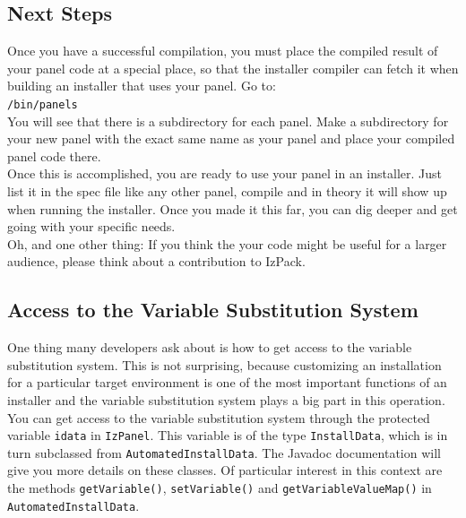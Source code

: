 \subsection{Next Steps}

Once you have a successful compilation, you must place the compiled result
of your panel code at a special place, so that the installer compiler can
fetch it when building an installer that uses your panel.  Go to:\\

\texttt{/bin/panels}\\

You will see that there is a subdirectory for each panel.  Make a
subdirectory for your new panel with the exact same name as your panel and
place your compiled panel code there.\\

Once this is accomplished, you are ready to use your panel in an
installer.  Just list it in the spec file like any other panel, compile
and in theory it will show up when running the installer.  Once you made
it this far, you can dig deeper and get going with your specific needs.\\

Oh, and one other thing: If you think the your code might be useful for a larger
audience, please think about a contribution to IzPack.

\subsection{Access to the Variable Substitution System}

One thing many developers ask about is how to get access to the variable
substitution system.  This is not surprising, because customizing an
installation for a particular target environment is one of the most
important functions of an installer and the variable substitution system
plays a big part in this operation.\\

You can get access to the variable substitution system through the
protected variable \texttt{idata} in \texttt{IzPanel}.  This variable is
of the type \texttt{InstallData}, which is in turn subclassed from
\texttt{AutomatedInstallData}.  The Javadoc documentation will give you
more details on these classes.  Of particular interest in this context are
the methods \texttt{getVariable()}, \texttt{setVariable()} and
\texttt{getVariableValueMap()} in \texttt{AutomatedInstallData}.\\

